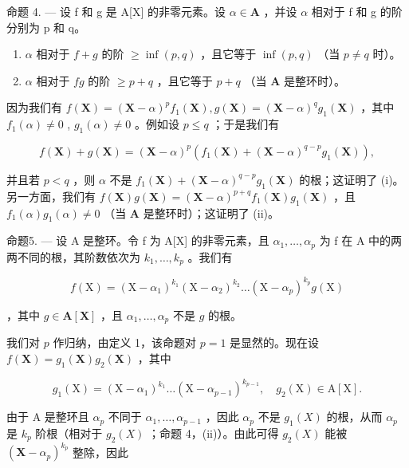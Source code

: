 命题 4. --- 设 f 和 g 是 A{[}X{]} 的非零元素。设 \(\alpha \in \mathbf{A}\) ，并设 \(\alpha\) 相对于 f 和 g 的阶分别为 p 和 q。

\begin{enumerate}
\def\labelenumi{(\roman{enumi})}
\item
  \(\alpha\) 相对于 \(f + g\) 的阶 \(\geqslant \inf(p, q)\) ，且它等于 \(\inf(p, q)\) （当 \(p \neq q\) 时）。
\item
  \(\alpha\) 相对于 \(fg\) 的阶 \(\geqslant p + q\) ，且它等于 \(p + q\) （当 \(\mathbf{A}\) 是整环时）。
\end{enumerate}

因为我们有 \(f(\mathbf{X}) = (\mathbf{X} - \alpha)^p f_1(\mathbf{X}), g(\mathbf{X}) = (\mathbf{X} - \alpha)^q g_1(\mathbf{X})\) ，其中 \(f_1(\alpha) \neq 0\) , \(g_1(\alpha) \neq 0\) 。例如设 \(p \leqslant q\) ；于是我们有

\[
f (\mathbf {X}) + g (\mathbf {X}) = (\mathbf {X} - \alpha) ^ {p} \left(f _ {1} (\mathbf {X}) + (\mathbf {X} - \alpha) ^ {q - p} g _ {1} (\mathbf {X})\right),
\]

并且若 \(p < q\) ，则 \(\alpha\) 不是 \(f_1(\mathbf{X}) + (\mathbf{X} - \alpha)^{q - p} g_1(\mathbf{X})\) 的根；这证明了 (i)。另一方面，我们有 \(f(\mathbf{X})g(\mathbf{X}) = (\mathbf{X} - \alpha)^{p + q} f_1(\mathbf{X})g_1(\mathbf{X})\) ，且 \(f_1(\alpha)g_1(\alpha) \neq 0\) （当 \(\mathbf{A}\) 是整环时）；这证明了 (ii)。

命题5. --- 设 A 是整环。令 f 为 A{[}X{]} 的非零元素，且 \(\alpha_{1},\ldots,\alpha_{p}\) 为 f 在 A 中的两两不同的根，其阶数依次为 \(k_{1},\ldots,k_{p}\) 。我们有

\[
f (\mathrm{X}) = \left(\mathrm{X} - \alpha_ {1}\right) ^ {k _ {1}} \left(\mathrm{X} - \alpha_ {2}\right) ^ {k _ {2}} \dots \left(\mathrm{X} - \alpha_ {p}\right) ^ {k _ {p}} g (\mathrm{X})
\]

，其中 \(g \in \mathbf{A}[\mathbf{X}]\) ，且 \(\alpha_1, \ldots, \alpha_p\) 不是 \(g\) 的根。

我们对 \(p\) 作归纳，由定义 1，该命题对 \(p = 1\) 是显然的。现在设 \(f(\mathbf{X}) = g_1(\mathbf{X})g_2(\mathbf{X})\) ，其中

\[
g _ {1} (\mathrm{X}) = \left(\mathrm{X} - \alpha_ {1}\right) ^ {k _ {1}} \dots \left(\mathrm{X} - \alpha_ {p - 1}\right) ^ {k _ {p - 1}}, \quad g _ {2} (\mathrm{X}) \in \mathrm{A} [ \mathrm{X} ].
\]

由于 A 是整环且 \(\alpha_{p}\) 不同于 \(\alpha_{1},\ldots,\alpha_{p-1}\) ，因此 \(\alpha_{p}\) 不是 \(g_{1}(X)\) 的根，从而 \(\alpha_{p}\) 是 \(k_{p}\) 阶根（相对于 \(g_{2}(X)\) ；命题 4，(ii)）。由此可得 \(g_{2}(X)\) 能被 \((\mathbf{X}-\alpha_{p})^{k_{p}}\) 整除，因此

